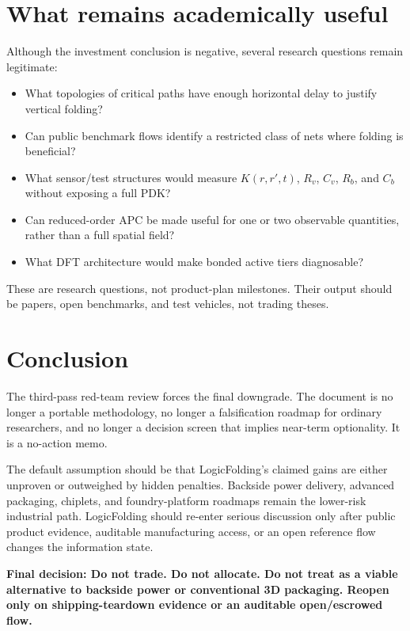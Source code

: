 \documentclass[11pt]{article}
\begin{document}
\section{What remains academically useful}
Although the investment conclusion is negative, several research questions remain legitimate:
\begin{itemize}
  \item What topologies of critical paths have enough horizontal delay to justify vertical folding?
  \item Can public benchmark flows identify a restricted class of nets where folding is beneficial?
  \item What sensor/test structures would measure $K(r,r',t)$, $R_v$, $C_v$, $R_b$, and $C_b$ without exposing a full PDK?
  \item Can reduced-order APC be made useful for one or two observable quantities, rather than a full spatial field?
  \item What DFT architecture would make bonded active tiers diagnosable?
\end{itemize}

These are research questions, not product-plan milestones. Their output should be papers, open benchmarks, and test vehicles, not trading theses.

\section{Conclusion}
The third-pass red-team review forces the final downgrade. The document is no longer a portable methodology, no longer a falsification roadmap for ordinary researchers, and no longer a decision screen that implies near-term optionality. It is a no-action memo.

The default assumption should be that LogicFolding's claimed gains are either unproven or outweighed by hidden penalties. Backside power delivery, advanced packaging, chiplets, and foundry-platform roadmaps remain the lower-risk industrial path. LogicFolding should re-enter serious discussion only after public product evidence, auditable manufacturing access, or an open reference flow changes the information state.

\textbf{Final decision: Do not trade. Do not allocate. Do not treat as a viable alternative to backside power or conventional 3D packaging. Reopen only on shipping-teardown evidence or an auditable open/escrowed flow.}

\clearpage
\end{document}
